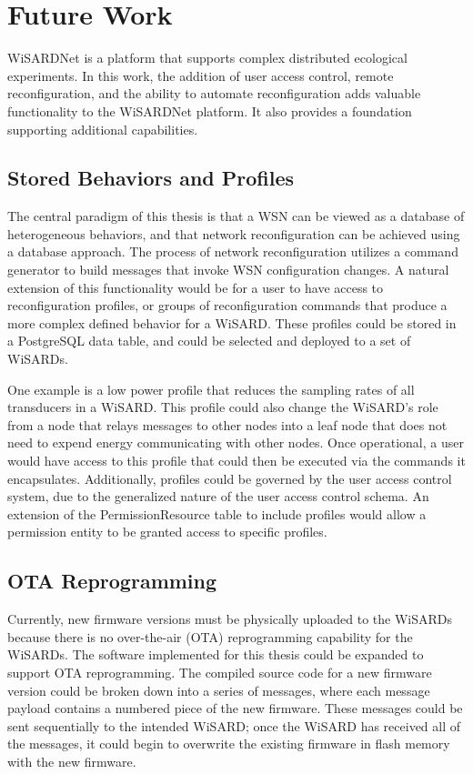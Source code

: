 \section{Future Work}
WiSARDNet is a platform that supports complex distributed ecological experiments. In this work, the addition of user access control, remote reconfiguration, and the ability to automate reconfiguration adds valuable functionality to the WiSARDNet platform. It also provides a foundation supporting additional capabilities. 

\subsection{Stored Behaviors and Profiles}
The central paradigm of this thesis is that a WSN can be viewed as a database of heterogeneous behaviors, and that network reconfiguration can be achieved using a database approach. The process of network reconfiguration utilizes a command generator to build messages that invoke WSN configuration changes. A natural extension of this functionality would be for a user to have access to reconfiguration profiles, or groups of reconfiguration commands that produce a more complex defined behavior for a WiSARD. These profiles could be stored in a PostgreSQL data table, and could be selected and deployed to a set of WiSARDs.

One example is a low power profile that reduces the sampling rates of all transducers in a WiSARD. This profile could also change the WiSARD's role from a node that relays messages to other nodes into a leaf node that does not need to expend energy communicating with other nodes. Once operational, a user would have access to this profile that could then be executed via the commands it encapsulates. Additionally, profiles could be governed by the user access control system, due to the generalized nature of the user access control schema. An extension of the PermissionResource table to include profiles would allow a permission entity to be granted access to specific profiles. 

\subsection{OTA Reprogramming}
Currently, new firmware versions must be physically uploaded to the WiSARDs because there is no over-the-air (OTA) reprogramming capability for the WiSARDs. The software implemented for this thesis could be expanded to support OTA reprogramming. The compiled source code for a new firmware version could be broken down into a series of messages, where each message payload contains a numbered piece of the new firmware. These messages could be sent sequentially to the intended WiSARD; once the WiSARD has received all of the messages, it could begin to overwrite the existing firmware in flash memory with the new firmware.

